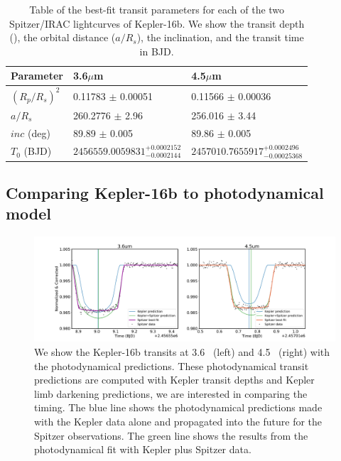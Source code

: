 \begin{table}
    \caption{Table of the best-fit transit parameters for each of the two Spitzer/IRAC lightcurves of Kepler-16b. We show the transit depth (\rprss), the orbital distance ($a/R_s$), the inclination, and the transit time in BJD.}

    \centering
    \begin{tabular}{lll}
    \hline \hline
    Parameter & 3.6$\mu$m & 4.5$\mu$m \\
    \hline
    $(R_p/R_s)^2$ &  0.11783 $\pm$ 0.00051 & 0.11566 $\pm$ 0.00036 \\
    $a/R_s$ & 260.2776 $\pm$ 2.96 & 256.016 $\pm$ 3.44   \\
    $inc$ (deg)  & 89.89 $\pm$ 0.005 & 89.86 $\pm$ 0.005 \\
    $T_0$ (BJD) &  $2456559.0059831^{+0.0002152}_{-0.0002144}$ &  $2457010.7655917^{+0.0002496}_{-0.00025368}$ \\
    \hline
    \end{tabular}
    \label{P4:tab:spitzerresults}
\end{table}

\subsection{Comparing Kepler-16b to photodynamical model}


\begin{figure}
    \centering
    \includegraphics[trim={3cm 0 3cm 0},clip, width=\linewidth]{Kepler16b_bestfit+pred+data.pdf}
    \caption{We show the Kepler-16b transits at 3.6\um~ (left) and 4.5\um~ (right) with the photodynamical predictions. These photodynamical transit predictions are computed with Kepler transit depths and Kepler limb darkening predictions, we are interested in comparing the timing. The blue line shows the photodynamical predictions made with the Kepler data alone and propagated into the future for the Spitzer observations. The green line shows the results from the photodynamical fit with Kepler plus Spitzer data. }
    \label{P4:fig:K16_photo}
\end{figure}

